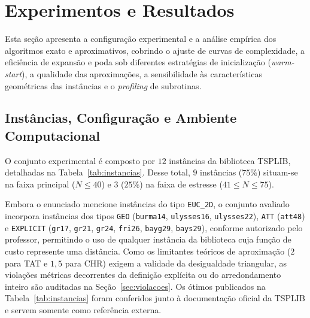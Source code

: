 \documentclass[12pt]{article}
\begin{document}
\section{Experimentos e Resultados}

Esta seção apresenta a configuração experimental e a análise empírica dos algoritmos exato e aproximativos, cobrindo o ajuste de curvas de complexidade, a eficiência de expansão e poda sob diferentes estratégias de inicialização (\textit{warm-start}), a qualidade das aproximações, a sensibilidade às características geométricas das instâncias e o \textit{profiling} de subrotinas.

\subsection{Instâncias, Configuração e Ambiente Computacional}

O conjunto experimental é composto por $12$ instâncias da biblioteca TSPLIB, detalhadas na Tabela~\ref{tab:instancias}. Desse total, $9$ instâncias ($75\%$) situam-se na faixa principal ($N \le 40$) e $3$ ($25\%$) na faixa de estresse ($41 \le N \le 75$).

Embora o enunciado mencione instâncias do tipo \texttt{EUC\_2D}, o conjunto avaliado incorpora instâncias dos tipos \texttt{GEO} (\texttt{burma14}, \texttt{ulysses16}, \texttt{ulysses22}), \texttt{ATT} (\texttt{att48}) e \texttt{EXPLICIT} (\texttt{gr17}, \texttt{gr21}, \texttt{gr24}, \texttt{fri26}, \texttt{bayg29}, \texttt{bays29}), conforme autorizado pelo professor, permitindo o uso de qualquer instância da biblioteca cuja função de custo represente uma distância. Como os limitantes teóricos de aproximação ($2$ para TAT e $1{,}5$ para CHR) exigem a validade da desigualdade triangular, as violações métricas decorrentes da definição explícita ou do arredondamento inteiro são auditadas na Seção~\ref{sec:violacoes}. Os ótimos publicados na Tabela~\ref{tab:instancias} foram conferidos junto à documentação oficial da TSPLIB e servem somente como referência externa.
\end{document}
